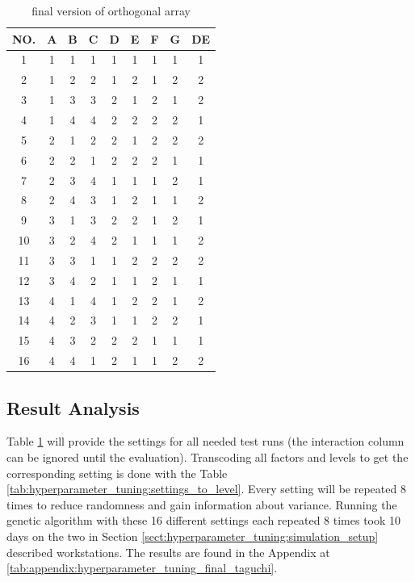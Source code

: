 \begin{table}[ht]
	\centering
	\begin{tabular}{ |c||c|c|c|c|c|c|c|c|  }
		\hline
		NO.& A & B & C & D & E & F & G & DE\\
		\hline
		1  & 1 & 1 & 1 & 1 & 1 & 1 & 1 & 1\\
		2  & 1 & 2 & 2 & 1 & 2 & 1 & 2 & 2\\
		3  & 1 & 3 & 3 & 2 & 1 & 2 & 1 & 2\\
		4  & 1 & 4 & 4 & 2 & 2 & 2 & 2 & 1\\
		5  & 2 & 1 & 2 & 2 & 1 & 2 & 2 & 2\\
		6  & 2 & 2 & 1 & 2 & 2 & 2 & 1 & 1\\
		7  & 2 & 3 & 4 & 1 & 1 & 1 & 2 & 1\\
		8  & 2 & 4 & 3 & 1 & 2 & 1 & 1 & 2\\
		9  & 3 & 1 & 3 & 2 & 2 & 1 & 2 & 1\\
		10 & 3 & 2 & 4 & 2 & 1 & 1 & 1 & 2\\
		11 & 3 & 3 & 1 & 1 & 2 & 2 & 2 & 2\\
		12 & 3 & 4 & 2 & 1 & 1 & 2 & 1 & 1\\
		13 & 4 & 1 & 4 & 1 & 2 & 2 & 1 & 2\\
		14 & 4 & 2 & 3 & 1 & 1 & 2 & 2 & 1\\
		15 & 4 & 3 & 2 & 2 & 2 & 1 & 1 & 1\\
		16 & 4 & 4 & 1 & 2 & 1 & 1 & 2 & 2\\
		\hline
	\end{tabular}
	\caption{final version of orthogonal array}
	\label{tab:hyperparameter_tuning:final_taguchi}
\end{table}


\subsection{Result Analysis}
\label{sect:hyperparameter_tuning:analysis_of_results}
Table \ref{tab:hyperparameter_tuning:final_taguchi} will provide the settings for all needed test runs (the interaction column can be ignored until the evaluation). Transcoding all factors and levels to get the corresponding setting is done with the Table \ref{tab:hyperparameter_tuning:settings_to_level}. Every setting will be repeated 8 times to reduce randomness and gain information about variance. 
Running the genetic algorithm with these 16 different settings each repeated 8 times took 10 days on the two in Section \ref{sect:hyperparameter_tuning:simulation_setup} described workstations. The results are found in the Appendix at \ref{tab:appendix:hyperparameter_tuning_final_taguchi}.


